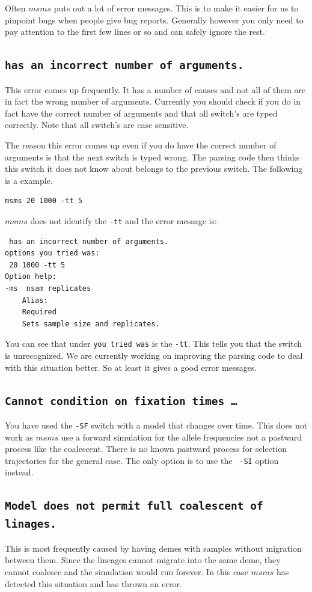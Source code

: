 \documentclass{article}
\begin{document}
Often $msms$ puts out a lot of error messages. This is to make it easier for us
to pinpoint bugs when people give bug reports. Generally however you only need to
pay attention to the first few lines or so and can safely ignore the rest.

\subsection{\tt has an incorrect number of arguments.}
This error comes up frequently. It has a number of causes and not all of them
are in fact the wrong number of arguments. Currently you should check if you do
in fact have the correct number of arguments and that all switch's are typed
correctly. Note that all switch's are case sensitive. 

The reason this error comes up even if you do have the correct number of
arguments is that the next switch is typed wrong. The parsing code then thinks
this switch it does not know about belongs to the previous switch. The following
is a example.
\begin{verbatim}
msms 20 1000 -tt 5
\end{verbatim}
$msms$ does not identify the {\tt -tt} and the error message is:
\begin{verbatim}
 has an incorrect number of arguments.
options you tried was:
 20 1000 -tt 5 
Option help:
-ms  nsam replicates 
	Alias: 
	Required
	Sets sample size and replicates.
\end{verbatim}
You can see that under {\tt you tried was} is the {\tt -tt}. This tells you that
the switch is unrecognized. We are currently working on improving the parsing code to deal with this
situation better. So at least it gives a good error messages. 

\subsection{\tt Cannot condition on fixation times \ldots}
You have used the {\tt -SF} switch with a model that changes over time. This
does not work as $msms$ use a forward simulation for the allele frequencies not a
pastward process like the coalescent. There is no known pastward process for
selection trajectories for the general case. The only option is to use the {\tt
-SI} option instead.

\subsection{\tt Model does not permit full coalescent of linages.}
This is most frequently caused by having demes with samples without migration
between them. Since the lineages cannot migrate into the same deme, they cannot
coalesce and the simulation would run forever. In this case $msms$ has detected
this situation and has thrown an error. 
\end{document}
